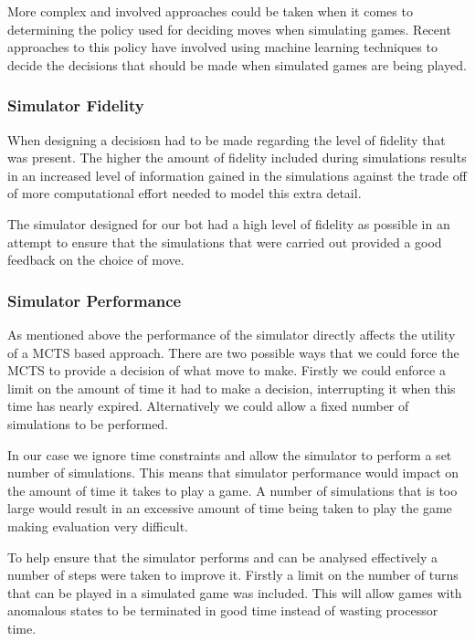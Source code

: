 \documentclass[]{article}
\begin{document}
\par More complex and involved approaches could be taken when it comes to determining the policy used for deciding moves when simulating games. Recent approaches to this policy have involved using machine learning techniques to decide the decisions that should be made when simulated games are being played. 

\subsubsection{Simulator Fidelity}
When designing a decisiosn had to be made regarding the level of fidelity that was present. The higher the amount of fidelity included during simulations results in an increased level of information gained in the simulations against the trade off of more computational effort needed to model this extra detail.

\par The simulator designed for our bot had a high level of fidelity as possible in an attempt to ensure that the simulations that were carried out provided a good feedback on the choice of move. 

\subsubsection{Simulator Performance}
As mentioned above the performance of the simulator directly affects the utility of a MCTS based approach. There are two possible ways that we could force the MCTS to provide a decision of what move to make. Firstly we could enforce a limit on the amount of time it had to make a decision, interrupting it when this time has nearly expired. Alternatively we could allow a fixed number of simulations to be performed.

\par In our case we ignore time constraints and allow the simulator to perform a set number of simulations. This means that simulator performance would impact on the amount of time it takes to play a game. A number of simulations that is too large would result in an excessive amount of time being taken to play the game making evaluation very difficult.

\par To help ensure that the simulator performs and can be analysed effectively a number of steps were taken to improve it. Firstly a limit on the number of turns that can be played in a simulated game was included. This will allow games with anomalous states to be terminated in good time instead of wasting processor time. 
\end{document}
